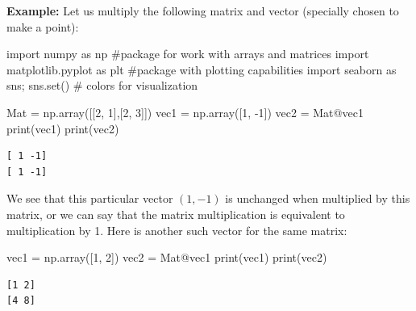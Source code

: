\documentclass[
  letterpaper,
  DIV=11,
  numbers=noendperiod]{scrreprt}
\newenvironment{Shaded}{\begin{snugshade}}{\end{snugshade}}
\newcommand{\BuiltInTok}[1]{\textcolor[rgb]{0.00,0.23,0.31}{#1}}
\newcommand{\CommentTok}[1]{\textcolor[rgb]{0.37,0.37,0.37}{#1}}
\newcommand{\DecValTok}[1]{\textcolor[rgb]{0.68,0.00,0.00}{#1}}
\newcommand{\ImportTok}[1]{\textcolor[rgb]{0.00,0.46,0.62}{#1}}
\newcommand{\NormalTok}[1]{\textcolor[rgb]{0.00,0.23,0.31}{#1}}
\newcommand{\OperatorTok}[1]{\textcolor[rgb]{0.37,0.37,0.37}{#1}}
\begin{document}
\textbf{Example:} Let us multiply the following matrix and vector
(specially chosen to make a point):

\begin{Shaded}
\begin{Highlighting}[]
\ImportTok{import}\NormalTok{ numpy }\ImportTok{as}\NormalTok{ np }\CommentTok{\#package for work with arrays and matrices}
\ImportTok{import}\NormalTok{ matplotlib.pyplot }\ImportTok{as}\NormalTok{ plt }\CommentTok{\#package with plotting capabilities}
\ImportTok{import}\NormalTok{ seaborn }\ImportTok{as}\NormalTok{ sns}\OperatorTok{;}\NormalTok{ sns.}\BuiltInTok{set}\NormalTok{() }\CommentTok{\# colors for visualization}
\end{Highlighting}
\end{Shaded}

\begin{Shaded}
\begin{Highlighting}[]
\NormalTok{Mat }\OperatorTok{=}\NormalTok{ np.array([[}\DecValTok{2}\NormalTok{, }\DecValTok{1}\NormalTok{],[}\DecValTok{2}\NormalTok{, }\DecValTok{3}\NormalTok{]])}
\NormalTok{vec1 }\OperatorTok{=}\NormalTok{ np.array([}\DecValTok{1}\NormalTok{, }\OperatorTok{{-}}\DecValTok{1}\NormalTok{])}
\NormalTok{vec2 }\OperatorTok{=}\NormalTok{ Mat}\OperatorTok{@}\NormalTok{vec1}
\BuiltInTok{print}\NormalTok{(vec1)}
\BuiltInTok{print}\NormalTok{(vec2)}
\end{Highlighting}
\end{Shaded}

\begin{verbatim}
[ 1 -1]
[ 1 -1]
\end{verbatim}

We see that this particular vector \((1,-1)\) is unchanged when
multiplied by this matrix, or we can say that the matrix multiplication
is equivalent to multiplication by 1. Here is another such vector for
the same matrix:

\begin{Shaded}
\begin{Highlighting}[]
\NormalTok{vec1 }\OperatorTok{=}\NormalTok{ np.array([}\DecValTok{1}\NormalTok{, }\DecValTok{2}\NormalTok{])}
\NormalTok{vec2 }\OperatorTok{=}\NormalTok{ Mat}\OperatorTok{@}\NormalTok{vec1}
\BuiltInTok{print}\NormalTok{(vec1)}
\BuiltInTok{print}\NormalTok{(vec2)}
\end{Highlighting}
\end{Shaded}

\begin{verbatim}
[1 2]
[4 8]
\end{verbatim}
\end{document}
